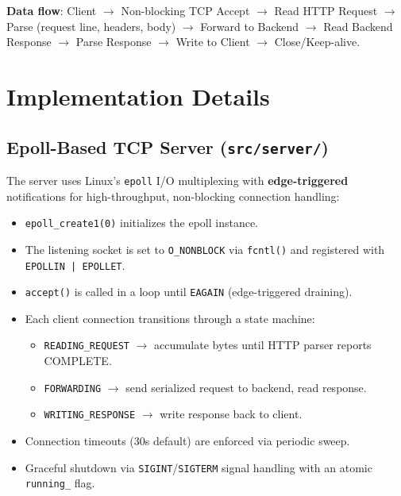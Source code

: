 \documentclass[11pt, a4paper]{article}
\begin{document}
\textbf{Data flow}: Client $\rightarrow$ Non-blocking TCP Accept $\rightarrow$ Read HTTP Request $\rightarrow$ Parse (request line, headers, body) $\rightarrow$ Forward to Backend $\rightarrow$ Read Backend Response $\rightarrow$ Parse Response $\rightarrow$ Write to Client $\rightarrow$ Close/Keep-alive.

\section{Implementation Details}

\subsection{Epoll-Based TCP Server (\texttt{src/server/})}
The server uses Linux's \texttt{epoll} I/O multiplexing with \textbf{edge-triggered} notifications for high-throughput, non-blocking connection handling:
\begin{itemize}
    \item \texttt{epoll\_create1(0)} initializes the epoll instance.
    \item The listening socket is set to \texttt{O\_NONBLOCK} via \texttt{fcntl()} and registered with \texttt{EPOLLIN | EPOLLET}.
    \item \texttt{accept()} is called in a loop until \texttt{EAGAIN} (edge-triggered draining).
    \item Each client connection transitions through a state machine:
    \begin{itemize}
        \item \texttt{READING\_REQUEST} $\rightarrow$ accumulate bytes until HTTP parser reports COMPLETE.
        \item \texttt{FORWARDING} $\rightarrow$ send serialized request to backend, read response.
        \item \texttt{WRITING\_RESPONSE} $\rightarrow$ write response back to client.
    \end{itemize}
    \item Connection timeouts (30s default) are enforced via periodic sweep.
    \item Graceful shutdown via \texttt{SIGINT}/\texttt{SIGTERM} signal handling with an atomic \texttt{running\_} flag.
\end{itemize}
\end{document}
